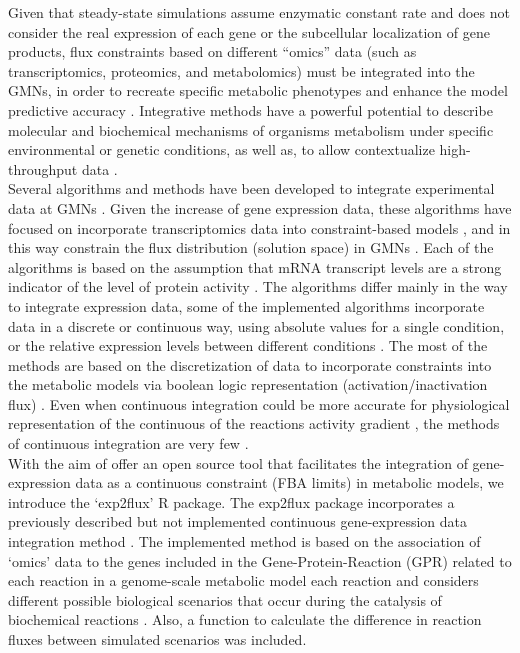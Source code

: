 Given that steady-state simulations assume enzymatic constant rate and does not consider the real expression of each gene or the subcellular localization of gene products, flux constraints based on different “omics” data (such as transcriptomics, proteomics, and metabolomics) must be integrated into the GMNs, in order to recreate specific metabolic phenotypes and enhance the model predictive accuracy \cite{palsson2002silico, chen2012metabolic, lewis2012constraining,topfer2013integration}. Integrative methods have a powerful potential to describe molecular and biochemical mechanisms of organisms metabolism under specific environmental or genetic conditions, as well as, to allow contextualize high-throughput data \cite{Oberhardt2009}.\\

Several algorithms and methods have been developed to integrate experimental data at GMNs \cite{Machado2014}. Given the increase of gene expression data, these algorithms have focused on incorporate transcriptomics data into constraint-based models \cite{covert2002transcriptional, aakesson2004integration,covert2004integrating}, and in this way constrain the flux distribution (solution space) in GMNs \cite{schellenberger2011quantitative, reed2012shrinking}. Each of the algorithms is based on the assumption that mRNA transcript levels are a strong indicator of the level of protein activity \cite{blazier2012integration}. The algorithms differ mainly in the way to integrate expression data, some of the implemented algorithms incorporate data in a discrete or continuous way, using absolute values for a single condition, or the relative expression levels between different conditions \cite{machado2014systematic}. The most of the methods are based on the discretization of data to incorporate constraints into the metabolic models via boolean logic representation (activation/inactivation flux) \cite{blazier2012integration}. Even when continuous integration could be more accurate for physiological representation of the continuous of the reactions activity gradient \cite{topfer2013integration}, the methods of continuous integration are very few \cite{machado2014systematic}.\\

With the aim of offer an open source tool that facilitates the integration of gene-expression data as a continuous constraint (FBA limits) in metabolic models, we introduce the ‘exp2flux’ R package. The exp2flux package incorporates a previously described but not implemented continuous gene-expression data integration method \cite{colijn2009interpreting,Carbonell2016}. The implemented method is based on the association of `omics' data to the genes included in the Gene-Protein-Reaction (GPR) related to each reaction in a genome-scale metabolic model  each reaction \cite{Thiele2010} and considers different possible biological scenarios that occur during the catalysis of biochemical reactions \cite{colijn2009interpreting}. Also, a function to calculate the difference in reaction fluxes between simulated scenarios was included.

